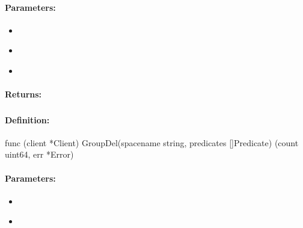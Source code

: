 \paragraph{Parameters:}
\begin{itemize}[noitemsep]
\item {}\\

\item {}\\

\item {}\\

\end{itemize}

\paragraph{Returns:}


\pagebreak
\subsubsection{}
\label{api:Go:GroupDel}


\paragraph{Definition:}
\begin{gocode}
func (client *Client) GroupDel(spacename string, predicates []Predicate) (count uint64, err *Error)
\end{gocode}

\paragraph{Parameters:}
\begin{itemize}[noitemsep]
\item {}\\

\item {}\\

\end{itemize}

